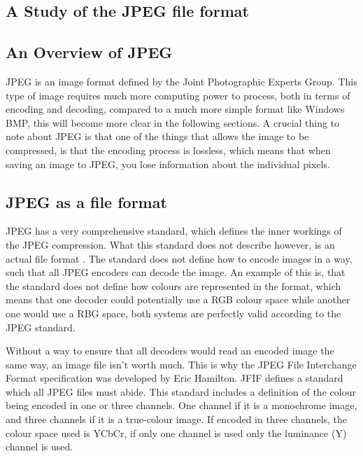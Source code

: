 
\begin{infobox}{\section[A Study of the JPEG file format]{A Study of the JPEG file format}}

\subsection*{An Overview of JPEG}
JPEG is an image format defined by the Joint Photographic Experts Group. 
This type of image requires much more computing power to process, both in terms of encoding and decoding, compared to a much more simple format like Windows BMP, this will become more clear in the following sections. 
A crucial thing to note about JPEG is that one of the things that allows the image to be compressed, is that the encoding process is lossless, which means that when saving an image to JPEG, you lose information about the individual pixels.

\subsection*{JPEG as a file format}

JPEG has a very comprehensive standard, which defines the inner workings of the JPEG compression. 
What this standard does not describe however, is an actual file format \citep{Miano1999}. 
The standard does not define how to encode images in a way, such that all JPEG encoders can decode the image. 
An example of this is, that the standard does not define how colours are represented in the format, which means that one decoder could potentially use a RGB colour space while another one would use a RBG space, both systems are perfectly valid according to the JPEG standard.

Without a way to ensure that all decoders would read an encoded image the same way, an image file isn't worth much. This is why the JPEG File Interchange Format specification \citep{JFIFSpecs} was developed by Eric Hamilton. JFIF defines a standard which all JPEG files must abide. This standard includes a definition of the colour being encoded in one or three channels. One channel if it is a monochrome image, and three channels if it is a true-colour image. If encoded in three channels, the colour space used is YCbCr, if only one channel is used only the luminance (Y) channel is used.


\end{infobox}
